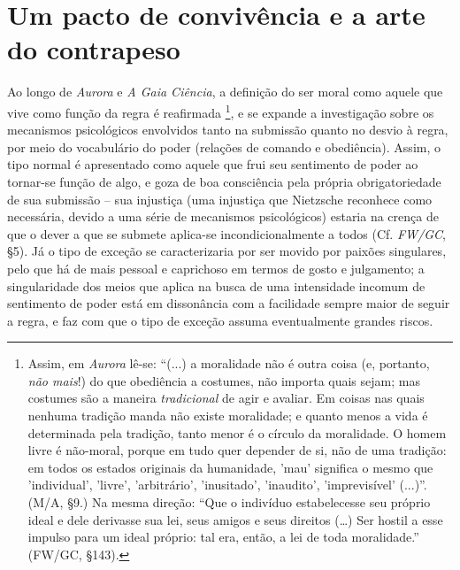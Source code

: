 \documentclass[
	12pt,				%
	openright,			%
	oneside,			%
	a4paper,			%
	english,			%
	french,				%
	spanish,			%
	brazil				%
	]{abntex2}
\begin{document}
\section{Um pacto de convivência e a arte do contrapeso}

Ao longo de \textit{Aurora} e \textit{A Gaia Ciência}, a definição do ser moral como aquele que vive como função da regra é reafirmada
\footnote{Assim, em \textit{Aurora} lê-se: “(...) a moralidade não é outra coisa (e, portanto, \textit{não mais}!) do que obediência a costumes, não importa quais sejam; mas costumes são a maneira \textit{tradicional} de agir e avaliar. Em coisas nas quais nenhuma tradição manda não existe moralidade; e quanto menos a vida é determinada pela tradição, tanto menor é o círculo da moralidade. O homem livre é não-moral, porque em tudo quer depender de si, não de uma tradição: em todos os estados originais da humanidade, 'mau' significa o mesmo que 'individual', 'livre', 'arbitrário', 'inusitado', 'inaudito', 'imprevisível' (...)”. (M/A, §9.) Na mesma direção: “Que o indivíduo estabelecesse seu próprio ideal e dele derivasse sua lei, seus amigos e seus direitos (…) Ser hostil a esse impulso para um ideal próprio: tal era, então, a lei de toda moralidade.” (FW/GC, §143).}, 
e se expande a investigação sobre os mecanismos psicológicos envolvidos tanto na submissão quanto no desvio à regra, por meio do vocabulário do poder (relações de comando e obediência). Assim, o tipo normal é apresentado como aquele que frui seu sentimento de poder ao tornar-se função de algo, e goza de boa consciência pela própria obrigatoriedade de sua submissão – sua injustiça (uma injustiça que Nietzsche reconhece como necessária, devido a uma série de mecanismos psicológicos) estaria na crença de que o dever a que se submete aplica-se incondicionalmente a todos (Cf. \textit{FW/GC}, §5). Já o tipo de exceção se caracterizaria por ser movido por paixões singulares, pelo que há de mais pessoal e caprichoso em termos de gosto e julgamento; a singularidade dos meios que aplica na busca de uma intensidade incomum de sentimento de poder está em dissonância com a facilidade sempre maior de seguir a regra, e faz com que o tipo de exceção assuma eventualmente grandes riscos.
	
\end{document}
